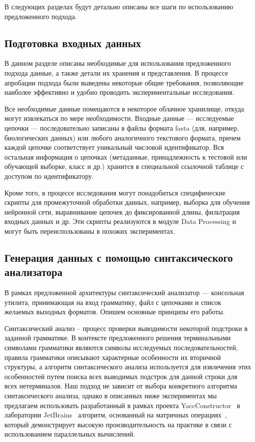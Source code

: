 \documentclass[14pt]{matmex-diploma-custom}
\begin{document}
В следующих разделах будут детально описаны все шаги по использованию предложенного подхода.

\subsection{Подготовка входных данных}

В данном разделе описаны необходимые для использования 
предложенного подхода данные, а также детали их хранения и представления. В процессе апробации подхода были выведены некоторые общие требования, позволяющие наиболее эффективно и удобно проводить экспериментальные исследования. 

Все необходимые данные помещаются в некоторое облачное хранилище, откуда могут извлекаться по мере необходимости. Входные данные --- исследуемые цепочки --- последовательно записаны в файлы формата fasta (для, например, биологических данных) или любого аналогичного текстового формата, причем каждой цепочке соответствует уникальный числовой идентификатор. Вся остальная информация о цепочках (метаданные, принадлежность к тестовой или обучающей выборке, класс и др.) хранится в специальной ссылочной таблице с доступом по идентификатору. 

Кроме того, в процессе исследования могут понадобиться специфические скрипты для промежуточной обработки данных, например, выборка для обучения нейронной сети, выравнивание цепочек до фиксированной длины, фильтрация входных данных и др. Эти скрипты реализуются в модуле Data Processing и могут быть переиспользованы в похожих экспериментах.

\subsection{Генерация данных с помощью синтаксического анализатора}
В рамках предложенной архитектуры синтаксический анализатор --- консольная утилита, принимающая на вход грамматику, файл с цепочками и список желаемых выходных форматов. Опишем основные принципы его работы.

Синтаксический анализ -- процесс проверки выводимости некоторой подстроки в заданной грамматике. В контексте предложенного решения терминальными символами грамматики являются символы исследуемых последовательностей, правила грамматики описывают характерные особенности их вторичной структуры, а алгоритм синтаксического анализа используется для извлечения этих особенностей путем поиска всех выводимых подстрок для данной строки для всех нетерминалов. Наш подход не зависит от выбора конкретного алгоритма синтаксического анализа, однако в описанных ниже экспериментах мы предлагаем использовать разработанный в рамках проекта YaccConstructor~\cite{yacc} в лаборатории JetBrains~\cite{jetbrains} алгоритм, основанный на матричных операциях~\cite{Azimov:2018:CPQ:3210259.3210264}, который демонстрирует высокую производительность на практике в связи с использованием параллельных вычислений.
\end{document}
